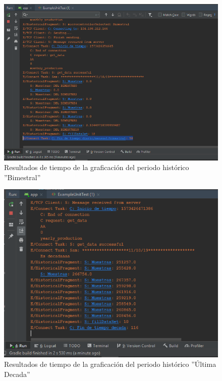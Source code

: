 \begin{figure}[H]
	\centering
	\includegraphics[scale=.6]{Capitulo5/images/TiempoGraficacionBimestral.png}
	\caption{Resultados de tiempo de la graficación del periodo histórico ''Bimestral''}	\label{fig:Tiempo_GraficacionHBimestral}
\end{figure} 
\begin{figure}[H]
	\centering
	\includegraphics[scale=.6]{Capitulo5/images/TiempoGraficacionUltimaDecada.png}
	\caption{Resultados de tiempo de la graficación del periodo histórico ''Última Decada''}	\label{fig:Tiempo_GraficacionHUltimaDecada}
\end{figure} 
